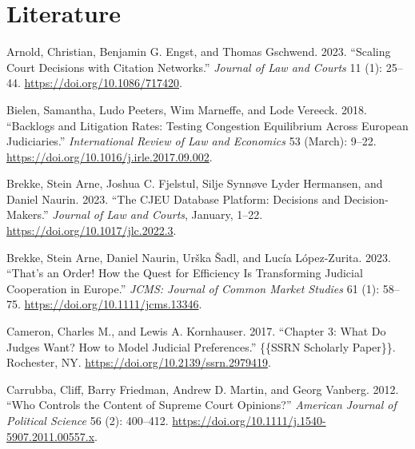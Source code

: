 \documentclass[
  11pt,
]{article}
\newlength{\cslhangindent}
\newenvironment{CSLReferences}[2] %
 {%
  \setlength{\parindent}{0pt}
  \ifodd #1 \everypar{\setlength{\hangindent}{\cslhangindent}}\ignorespaces\fi
  \ifnum #2 > 0
  \setlength{\parskip}{#2\baselineskip}
  \fi
 }%
 {}
\begin{document}
\hypertarget{literature}{%
\section*{Literature}\label{literature}}

\hypertarget{refs}{}
\begin{CSLReferences}{1}{0}
\leavevmode{}%
Arnold, Christian, Benjamin G. Engst, and Thomas Gschwend. 2023.
{``Scaling {Court Decisions} with {Citation Networks}.''} \emph{Journal
of Law and Courts} 11 (1): 25--44. \url{https://doi.org/10.1086/717420}.

\leavevmode{}%
Bielen, Samantha, Ludo Peeters, Wim Marneffe, and Lode Vereeck. 2018.
{``Backlogs and Litigation Rates: {Testing} Congestion Equilibrium
Across {European} Judiciaries.''} \emph{International Review of Law and
Economics} 53 (March): 9--22.
\url{https://doi.org/10.1016/j.irle.2017.09.002}.

\leavevmode{}%
Brekke, Stein Arne, Joshua C. Fjelstul, Silje Synnøve Lyder Hermansen,
and Daniel Naurin. 2023. {``The {CJEU Database Platform}: {Decisions}
and {Decision-Makers}.''} \emph{Journal of Law and Courts}, January,
1--22. \url{https://doi.org/10.1017/jlc.2022.3}.

\leavevmode{}%
Brekke, Stein Arne, Daniel Naurin, Urška Šadl, and Lucía López-Zurita.
2023. {``That's an {Order}! {How} the {Quest} for {Efficiency Is
Transforming Judicial Cooperation} in {Europe}.''} \emph{JCMS: Journal
of Common Market Studies} 61 (1): 58--75.
\url{https://doi.org/10.1111/jcms.13346}.

\leavevmode{}%
Cameron, Charles M., and Lewis A. Kornhauser. 2017. {``Chapter 3: {What
Do Judges Want}? {How} to {Model Judicial Preferences}.''} \{\{SSRN
Scholarly Paper\}\}. {Rochester, NY}.
\url{https://doi.org/10.2139/ssrn.2979419}.

\leavevmode{}%
Carrubba, Cliff, Barry Friedman, Andrew D. Martin, and Georg Vanberg.
2012. {``Who {Controls} the {Content} of {Supreme Court Opinions}?''}
\emph{American Journal of Political Science} 56 (2): 400--412.
\url{https://doi.org/10.1111/j.1540-5907.2011.00557.x}.


\end{CSLReferences}
\end{document}
